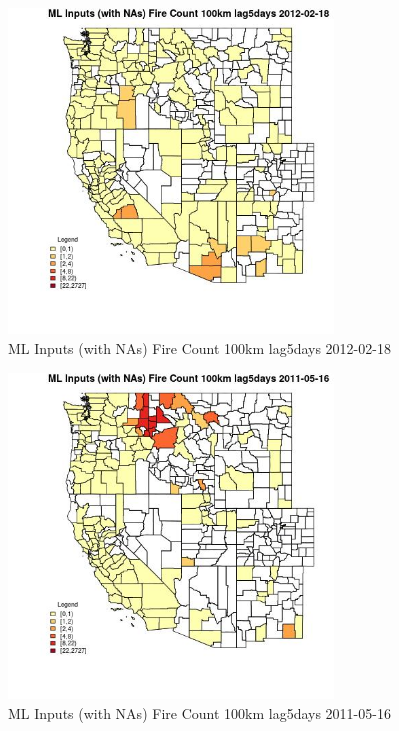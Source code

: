 \begin{figure} 
\centering  
\includegraphics[width=0.77\textwidth]{Code_Outputs/Report_ML_input_PM25_Step4_part_f_de_duplicated_aves_prioritize_24hr_obswNAs_CountyFire_Count_100km_lag5daysMean2012-02-18.jpg} 
\caption{\label{fig:Report_ML_input_PM25_Step4_part_f_de_duplicated_aves_prioritize_24hr_obswNAsCountyFire_Count_100km_lag5daysMean2012-02-18}ML Inputs (with NAs) Fire Count 100km lag5days 2012-02-18} 
\end{figure} 
 

\begin{figure} 
\centering  
\includegraphics[width=0.77\textwidth]{Code_Outputs/Report_ML_input_PM25_Step4_part_f_de_duplicated_aves_prioritize_24hr_obswNAs_CountyFire_Count_100km_lag5daysMean2011-05-16.jpg} 
\caption{\label{fig:Report_ML_input_PM25_Step4_part_f_de_duplicated_aves_prioritize_24hr_obswNAsCountyFire_Count_100km_lag5daysMean2011-05-16}ML Inputs (with NAs) Fire Count 100km lag5days 2011-05-16} 
\end{figure} 
 

